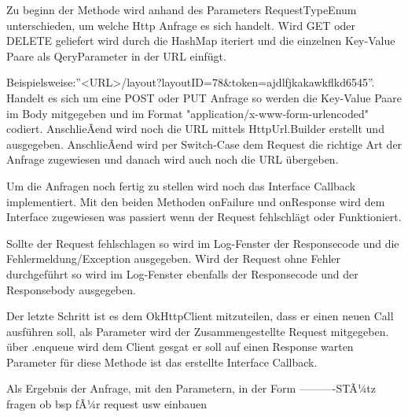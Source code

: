 Zu beginn der Methode wird anhand des Parameters RequestTypeEnum unterschieden, um welche Http Anfrage es sich handelt. Wird GET oder DELETE geliefert wird durch die HashMap iteriert und die einzelnen Key-Value Paare als QeryParameter in der URL einfügt.

Beispielsweise:''<URL>/layout?layoutID=78&token=ajdlfjkakawkflkd6545''.
Handelt es sich um eine POST oder PUT Anfrage so werden die Key-Value Paare im Body mitgegeben und im Format "application/x-www-form-urlencoded" codiert. AnschlieÃend wird noch die URL mittels HttpUrl.Builder erstellt und ausgegeben. 
AnschlieÃend wird per Switch-Case dem Request die richtige Art der Anfrage zugewiesen und danach wird auch noch die URL übergeben. 

Um die Anfragen noch fertig zu stellen wird noch das Interface Callback implementiert. Mit den beiden Methoden onFailure und onResponse wird dem Interface zugewiesen was passiert wenn der Request fehlschlägt oder Funktioniert. 

Sollte der Request fehlschlagen so wird im Log-Fenster der Responsecode und die Fehlermeldung/Exception ausgegeben. 
Wird der Request ohne Fehler durchgeführt so wird im Log-Fenster ebenfalls der Responsecode und der Responsebody ausgegeben.

Der letzte Schritt ist es dem OkHttpClient mitzuteilen, dass er einen neuen Call ausführen soll, als Parameter wird der Zusammengestellte Request mitgegeben. über .enqueue wird dem Client gesgat er soll auf einen Response warten Parameter für diese Methode ist das erstellte Interface Callback.






Als Ergebnis der Anfrage, mit den Parametern, in der Form
----------STÃ¼tz fragen ob bsp fÃ¼r request usw einbauen



